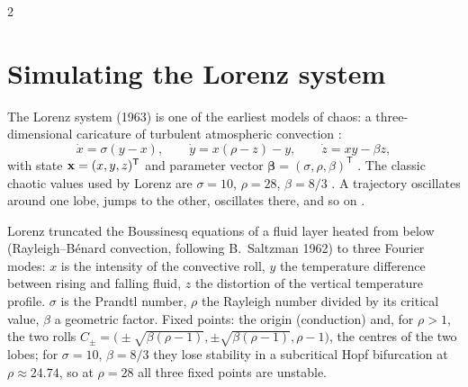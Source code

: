 \begin{paracol}{2}
\section{Simulating the Lorenz system}\label{sec:si-lorenz}

The Lorenz system (1963) is one of the earliest models of chaos: a three-dimensional caricature of
turbulent atmospheric convection :
\begin{equation}\label{eq:si-lorenz}
  \dot x=\sigma(y-x),\qquad \dot y=x(\rho-z)-y,\qquad \dot z=xy-\beta z ,
\end{equation}
with state $\mathbf{x}=(x,y,z)^{\mathsf T}$ and parameter vector $\boldsymbol\beta=(\sigma,\rho,\beta)^{\mathsf T}$
. The classic chaotic values used by Lorenz are $\sigma=10$, $\rho=28$,
$\beta=8/3$ . A trajectory oscillates around one lobe, jumps to the other, oscillates
there, and so on .

\begin{secondary}
Lorenz truncated the Boussinesq equations of a fluid layer heated from below (Rayleigh--B\'enard
convection, following B.~Saltzman 1962) to three Fourier modes: $x$ is the intensity of the convective
roll, $y$ the temperature difference between rising and falling fluid, $z$ the distortion of the
vertical temperature profile. $\sigma$ is the Prandtl number, $\rho$ the Rayleigh number divided by its
critical value, $\beta$ a geometric factor. Fixed points: the origin (conduction) and, for $\rho>1$, the
two rolls $C_\pm=\big(\pm\sqrt{\beta(\rho-1)},\pm\sqrt{\beta(\rho-1)},\rho-1\big)$, the centres of the two
lobes; for $\sigma=10$, $\beta=8/3$ they lose stability in a subcritical Hopf bifurcation at
$\rho\approx24.74$, so at $\rho=28$ all three fixed points are unstable.
\end{secondary}


\end{paracol}
